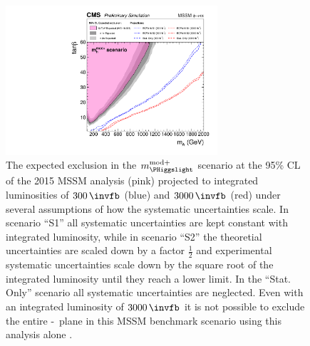 \begin{figure}[h!]
\begin{center}
\includegraphics[width=0.7\textwidth]{./Conclusion/Figures/scenario_comp2.pdf}
\end{center}
\caption[The expected exclusion in the $m_{\PHiggslight}^{\text{mod+}}$ scenario
at the 95\% CL of the 2015 MSSM analysis, projected to integrated luminosities of $300$ and $3000\,\invfb$.]{The expected exclusion in the $m_{\PHiggslight}^{\text{mod+}}$ scenario
 at the 95\% CL of the 2015 MSSM analysis (pink)
projected to integrated luminosities of $300\,\invfb$ (blue) and $3000\,\invfb$ (red)
under several assumptions of how the systematic uncertainties scale. In scenario ``S1''
all systematic uncertainties are kept constant with integrated luminosity, while in scenario ``S2'' 
the theoretial uncertainties are scaled down by a factor $\frac{1}{2}$ and experimental
systematic uncertainties scale down by the square root of the integrated luminosity until they reach
a lower limit. In the ``Stat. Only'' scenario all systematic uncertainties are neglected. Even with an integrated 
luminosity of $3000\,\invfb$ it is not possible to exclude the entire \mA-\tanb~plane
in this \ac{MSSM} benchmark scenario using this analysis alone \cite{HTT-projection}.}
\label{fig:mssm_projection_fig}
\end{figure}


